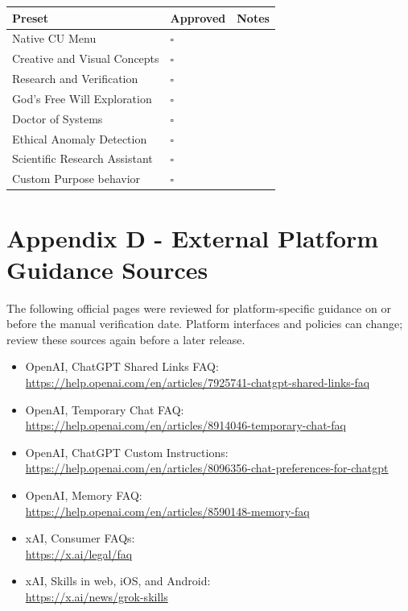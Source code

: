\documentclass[11pt,letterpaper]{article}
\newcommand{\checkbox}{\(\square\)}
\begin{document}
\begin{longtable}{L{2.1in}L{0.75in}L{3.5in}}
\toprule
\textbf{Preset} & \textbf{Approved} & \textbf{Notes} \\
\midrule
\endhead
Native CU Menu & \checkbox &  \\
Creative and Visual Concepts & \checkbox &  \\
Research and Verification & \checkbox &  \\
God's Free Will Exploration & \checkbox &  \\
Doctor of Systems & \checkbox &  \\
Ethical Anomaly Detection & \checkbox &  \\
Scientific Research Assistant & \checkbox &  \\
Custom Purpose behavior & \checkbox &  \\
\bottomrule
\end{longtable}

\section{Appendix D - External Platform Guidance Sources}

The following official pages were reviewed for platform-specific guidance on or
before the manual verification date. Platform interfaces and policies can change;
review these sources again before a later release.

\begin{itemize}
    \item OpenAI, ChatGPT Shared Links FAQ:\\
          \url{https://help.openai.com/en/articles/7925741-chatgpt-shared-links-faq}
    \item OpenAI, Temporary Chat FAQ:\\
          \url{https://help.openai.com/en/articles/8914046-temporary-chat-faq}
    \item OpenAI, ChatGPT Custom Instructions:\\
          \url{https://help.openai.com/en/articles/8096356-chat-preferences-for-chatgpt}
    \item OpenAI, Memory FAQ:\\
          \url{https://help.openai.com/en/articles/8590148-memory-faq}
    \item xAI, Consumer FAQs:\\
          \url{https://x.ai/legal/faq}
    \item xAI, Skills in web, iOS, and Android:\\
          \url{https://x.ai/news/grok-skills}
\end{itemize}
\end{document}
